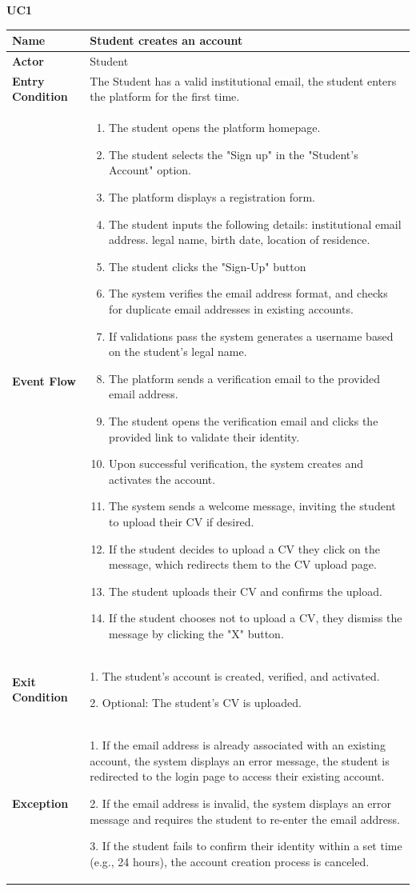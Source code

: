 \textbf{UC1}
\begin{longtable}{|p{}|p{}|}
\hline
\textbf{Name} & Student creates an account \\
\hline
\textbf{Actor} & Student\\
\hline
\textbf{Entry Condition} & The Student has a valid institutional email, the student enters the platform for the first time.\\
\hline
\textbf{Event Flow} & 
\begin{enumerate}
    \item The student opens the platform homepage.
    \item The student selects the "Sign up" in the "Student's Account" option.
    \item The platform displays a registration form.
    \item The student inputs the following details:	institutional email address. legal name, birth date, location of residence.
    \item The student clicks the "Sign-Up" button
    \item The system verifies the email address format, and checks for duplicate email addresses in existing accounts.
    \item  If validations pass the system generates a username based on the student’s legal name.
    \item The platform sends a verification email to the provided email address.
    \item The student opens the verification email and clicks the provided link to validate their identity.
    \item Upon successful verification, the system creates and activates the account.
    \item The system sends a welcome message, inviting the student to upload their CV if desired.
    \item  If the student decides to upload a CV they click on the message, which redirects them to the CV upload page.
    \item The student uploads their CV and confirms the upload.
    \item If the student chooses not to upload a CV, they dismiss the message by clicking the "X" button.
\end{enumerate} \\
\hline
\textbf{Exit Condition} & 
1. The student’s account is created, verified, and activated.

2. Optional: The student’s CV is uploaded.\\
\hline
\textbf{Exception} & 
1. If the email address is already associated with an existing account, the system displays an error message, the student is redirected to the login page to access their existing account.	

2. If the email address is invalid, the system displays an error message and requires the student to re-enter the email address.	

3. If the student fails to confirm their identity within a set time (e.g., 24 hours), the account creation process is canceled.\\
\hline
\end{longtable}

